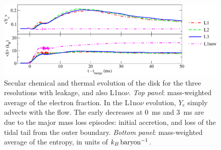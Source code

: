 \begin{figure}
\centering
\includegraphics[width=16cm]{Figures/global_measures}
\caption[Secular chemical and thermal evolution of the disk]{
Secular chemical and thermal evolution of the disk for the three resolutions
with leakage, and also L1no$\nu$.
{\em Top panel}: mass-weighted average of the electron fraction.
In the L1no$\nu$ evolution, $Y_e$ simply advects with the flow.
The early decreases at 0~ms and 3~ms are due to the major mass loss episodes:
initial accretion, and loss of the tidal tail from the outer boundary.
{\em Bottom panel}: mass-weighted average of the entropy, in units of
$k_B\rm\,baryon^{-1}$.
}
\label{fig:globalevolution}
\end{figure}

